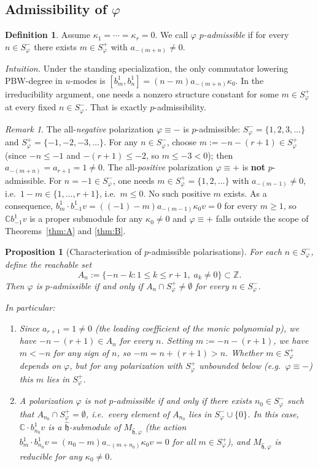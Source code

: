 \documentclass{amsart}
\newcommand{\Cx}{\mathbb{C}}
\newcommand{\Z}{\mathbb{Z}}
\newcommand{\h}{\mathfrak{h}}
\newcommand{\wh}[1]{\widehat{#1}}
\newcommand{\whh}{\wh{\h}}
\newtheorem{proposition}[theorem]{Proposition}
\theoremstyle{definition}
\newtheorem{definition}[theorem]{Definition}
\theoremstyle{remark}
\newtheorem{remark}[theorem]{Remark}
\numberwithin{equation}{section}
\begin{document}
\subsection{Admissibility of $\varphi$}\label{subsec:admissibility}
\begin{definition}\label{def:phi-admissible}
Assume $\kappa_1=\cdots=\kappa_r=0$.  We call $\varphi$
\emph{$p$-admissible} if for every $n\in S_\varphi^-$ there exists
$m\in S_\varphi^+$ with $a_{-(m+n)}\neq0$.
\end{definition}
\noindent\textit{Intuition.}
Under the standing specialization, the only commutator lowering PBW-degree
in $u$-modes is $[b_m^1,b_n^1]=(n-m)a_{-(m+n)}\kappa_0$.  In the
irreducibility argument, one needs a nonzero structure constant for some
$m\in S_\varphi^+$ at every fixed $n\in S_\varphi^-$.  That is exactly
$p$-admissibility.
\begin{remark}\label{rem:standard-admissible}
The all-\emph{negative} polarization $\varphi\equiv-$ is $p$-admissible:
$S_\varphi^-=\{1,2,3,\dots\}$ and $S_\varphi^+=\{-1,-2,-3,\dots\}$.
For any $n\in S_\varphi^-$, choose $m:=-n-(r+1)\in S_\varphi^+$
(since $-n\le-1$ and $-(r+1)\le-2$, so $m\le-3<0$); then
$a_{-(m+n)}=a_{r+1}=1\neq0$.
The all-\emph{positive} polarization $\varphi\equiv+$ is \textbf{not}
$p$-admissible.  For $n=-1\in S_\varphi^-$, one needs $m\in
S_\varphi^+=\{1,2,\dots\}$ with $a_{-(m-1)}\neq0$, i.e.\
$1-m\in\{1,\dots,r+1\}$, i.e.\ $m\le0$.  No such positive $m$ exists.
As a consequence, $b_m^1\cdot b_{-1}^1v=((-1)-m)a_{-(m-1)}\kappa_0 v=0$
for every $m\ge1$, so $\Cx b_{-1}^1v$ is a proper submodule for any
$\kappa_0\neq0$ and $\varphi\equiv+$ falls outside the scope of
Theorems~\ref{thm:A} and \ref{thm:B}.
\end{remark}
\begin{proposition}[Characterisation of $p$-admissible polarisations]
\label{prop:p-admissible-char}
For each $n\in S_\varphi^-$, define the \emph{reachable set}
\[
A_n := \{-n-k : 1\le k\le r+1,\; a_k\neq0\}
      \subset \Z.
\]
Then $\varphi$ is $p$-admissible if and only if
$A_n\cap S_\varphi^+\neq\emptyset$ for every $n\in S_\varphi^-$.

In particular:
\begin{enumerate}[label=(\roman*)]
\item Since $a_{r+1}=1\neq0$ (the leading coefficient of the monic
  polynomial $p$), we have $-n-(r+1)\in A_n$ for every $n$.  Setting
  $m:=-n-(r+1)$, we have $m<-n$ for any sign of $n$, so
  $-m=n+(r+1)>n$.  Whether $m\in S_\varphi^+$ depends on $\varphi$, but
  for any polarization with $S_\varphi^+$ unbounded below (e.g.\
  $\varphi\equiv-$) this $m$ lies in $S_\varphi^+$.
\item A polarization $\varphi$ is \emph{not} $p$-admissible if and only
  if there exists $n_0\in S_\varphi^-$ such that
  $A_{n_0}\cap S_\varphi^+=\emptyset$, i.e.\ every element of $A_{n_0}$
  lies in $S_\varphi^-\cup\{0\}$.  In this case, $\Cx\cdot b_{n_0}^1 v$
  is a $\whh$-submodule of $M_{\whh,\varphi}$ (the action
  $b_m^1\cdot b_{n_0}^1 v=(n_0-m)a_{-(m+n_0)}\kappa_0 v=0$ for all
  $m\in S_\varphi^+$), and $M_{\whh,\varphi}$ is reducible for any
  $\kappa_0\neq0$.
\end{enumerate}
\end{proposition}
\end{document}
